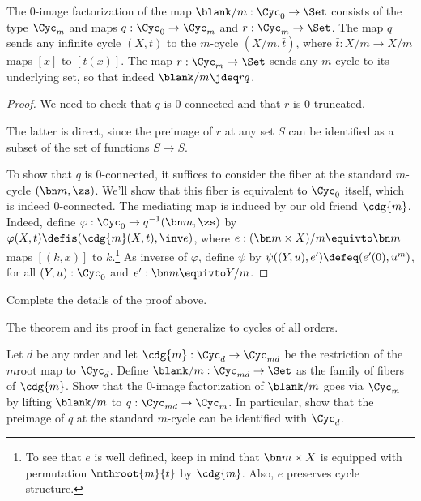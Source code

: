 \begin{theorem}\label{thm:image-Z-to-Cm}
  The $0$-image factorization of the map $\blank/m : \Cyc_0 \to \Set$
  consists of the type $\Cyc_m$ and maps $q : \Cyc_0 \to \Cyc_m$
  and $r:\Cyc_m\to\Set$. The map $q$
  sends any infinite cycle $(X,t)$ to the $m$-cycle $(X/m,\bar t)$,
  where $\bar t : X/m \to X/m$ maps $[x]$ to $[t(x)]$. The map
  $r:\Cyc_m\to\Set$ sends any $m$-cycle to its underlying set,
  so that indeed $\blank/m \jdeq rq$.
\end{theorem}

\begin{proof}
  We need to check that $q$ is $0$-connected
  and that $r$ is $0$-truncated.

  The latter is direct, since the preimage of $r$ at any set $S$
  can be identified as a subset of the set of functions $S\to S$.

  To show that $q$ is $0$-connected,
  it suffices to consider the fiber at the standard $m$-cycle $(\bn m,\zs)$.
  We'll show that this fiber is equivalent to $\Cyc_0$ itself, 
  which is indeed $0$-connected.
  The mediating map is induced by our old friend $\cdg{m}$.
  Indeed, define $\varphi : \Cyc_0 \to q^{-1}(\bn m,\zs)$
  by $\varphi(X,t)\defis(\cdg{m}(X,t),\inv e)$, where 
  $e: (\bn m\times X)/m \equivto \bn m$ maps $[(k,x)]$ to $k$.\footnote{%
  To see that $e$ is well defined, keep in mind that $\bn m\times X$ 
  is equipped with permutation $\mthroot{m}{t}$ by $\cdg{m}$. Also,
  $e$ preserves cycle structure.} 
  As inverse of $\varphi$, define $\psi$ by 
  $\psi((Y,u),e')\defeq(e'(0), u^m)$, for all
  $(Y,u):\Cyc_0$ and $e' : \bn m \equivto Y/m$.
\end{proof}

\begin{xca}
  Complete the details of the proof above.
\end{xca}

The theorem and its proof in fact generalize to cycles of all orders.

\begin{xca}\label{xca:image-Cmd-to-Cm}
  Let $d$ be any order and let $\cdg{m} : \Cyc_d\to\Cyc_{md}$
  be the restriction of the $m$\th root map to $\Cyc_d$.
  Define $\blank/m : \Cyc_{md} \to \Set$ as the family of fibers
  of $\cdg{m}$.
  Show that the $0$-image factorization of $\blank/m$ goes via $\Cyc_m$ by
  lifting $\blank/m$ to $q : \Cyc_{md} \to \Cyc_m$.
  In particular, show that the preimage of $q$ at the standard $m$-cycle
  can be identified with $\Cyc_d$.
\end{xca}


